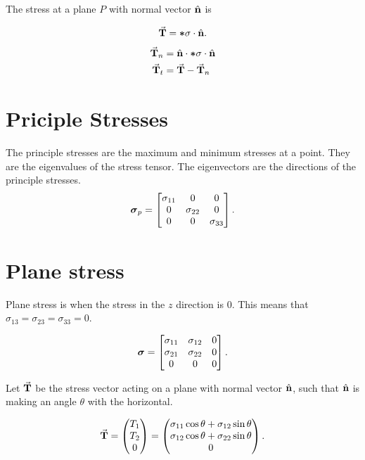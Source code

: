 \documentclass{report}
\begin{document}
The stress at a plane $P$ with normal vector $\hat{\bm{\mathrm{n}}}$ is

\[
	\vec{\bm{\mathrm{T}}} = \bm{\mathrm{*}}{\sigma} \cdot \hat{\bm{\mathrm{n}}}
	.\]

\begin{align*}
	\vec{\bm{\mathrm{T}}}_n & = \hat{\bm{\mathrm{n}}} \cdot \bm{\mathrm{*}}{\sigma} \cdot \hat{\bm{\mathrm{n}}} \\
	\vec{\bm{\mathrm{T}}}_t & = \vec{\bm{\mathrm{T}}} - \vec{\bm{\mathrm{T}}}_n
\end{align*}

\section{Priciple Stresses}

The principle stresses are the maximum and minimum stresses at a point. They are the eigenvalues of the stress tensor. The eigenvectors are the directions of the principle stresses. \\

\[
	\bm{\mathrm{\sigma}}_p = \begin{bmatrix}
		\sigma_{11} & 0           & 0           \\
		0           & \sigma_{22} & 0           \\
		0           & 0           & \sigma_{33}
	\end{bmatrix}
	.\]

\section{Plane stress}

Plane stress is when the stress in the $z$ direction is 0. This means that $\sigma_{13} = \sigma_{23} = \sigma_{33} = 0$.

\[
	\bm{\mathrm{\sigma}} = \begin{bmatrix}
		\sigma_{11} & \sigma_{12} & 0 \\
		\sigma_{21} & \sigma_{22} & 0 \\
		0           & 0           & 0
	\end{bmatrix}
	.\]

Let $\vec{\bm{\mathrm{T}}}$ be the stress vector acting on a plane with normal vector $\hat{\bm{\mathrm{n}}}$, such that $\hat{\bm{\mathrm{n}}}$ is making an angle $\theta$ with the horizontal.

\[
	\vec{\bm{\mathrm{T}}} = \begin{pmatrix}
		T_1 \\
		T_2 \\
		0
	\end{pmatrix} = \begin{pmatrix}
		\sigma_{11}\cos\theta + \sigma_{12}\sin\theta \\
		\sigma_{12}\cos\theta + \sigma_{22}\sin\theta \\
		0
	\end{pmatrix}
	.\]
\end{document}
